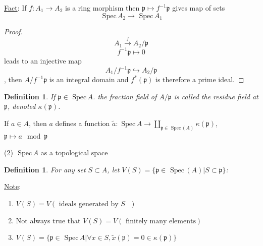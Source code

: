 \documentclass[11pt]{article}
\newtheorem{dfn}[thm]{Definition}
\newcommand{\spec}{\text{ Spec}\,}
\newcommand{\scp}{{\mathfrak p}}
\newcommand{\lrta}{\longrightarrow}
\newcommand{\inj}{\hookrightarrow}
\begin{document}
\underline{Fact}: If $f: A_1\lrta A_2$ is a ring morphism then $\scp\mapsto f^{-1}\scp$ gives map of sets
$$
\spec A_2\lrta \spec A_1
$$
\begin{proof}
$$A_1\overset{f}{\lrta}A_2/\scp$$
$$f^{-1}\scp\mapsto 0$$
 leads to an injective map
 $$
A_1/f^{-1}\scp\inj A_2/\scp
$$, then $A/f^{-1}\scp$ is an integral domain and $f^*(\scp)$ is therefore a prime ideal.
\end{proof}

\begin{dfn}
If $\scp\in\spec A$. the fraction field of $A/\scp$ is called the residue field at $\scp$, denoted $\kappa(\scp)$. 
\end{dfn}
If $a\in A$, then $a$ defines a function
$\tilde{a}:\spec A\lrta\coprod_{\scp\in \spec(A)}\kappa(\scp)$, $\scp\mapsto a\mod \scp$


(2) $\spec A$ as a topological space
\begin{dfn}
For any set $S\subset A$, let $V(S)=\{\scp\in\spec(A)|S\subset \scp\}$:
\end{dfn}
\underline{Note}: 
\begin{enumerate}[label=(\arabic*)]
\item $V(S)=V(\text{ ideals generated by $S$ })$
\item Not always true that $V(S)=V(\text{ finitely many elements})$
\item $V(S)=\{\scp\in\spec A|\forall x\in S, \tilde{x}(\scp)=0\in\kappa(\scp)\}$
\end{enumerate}
\end{document}
